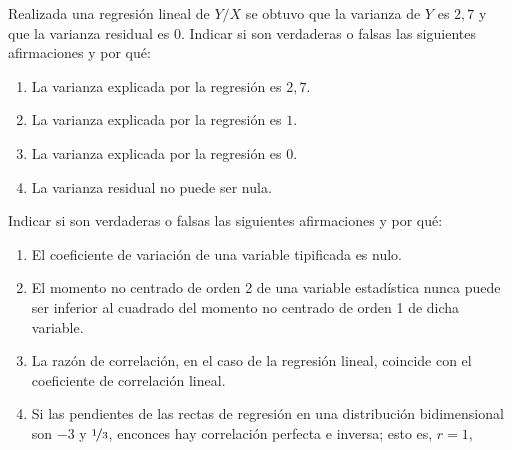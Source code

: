 \documentclass[12pt]{article}
\begin{document}
    \begin{ejercicio}
        Realizada una regresión lineal de $Y/X$ se obtuvo que la varianza de $Y$ es $2,7$ y que la varianza residual es 0. Indicar si son verdaderas o falsas las siguientes afirmaciones y por qué:
        \begin{enumerate}[label=\alph*)]
            \item La varianza explicada por la regresión es $2,7$.
            \item La varianza explicada por la regresión es $1$.
            \item La varianza explicada por la regresión es $0$.
            \item La varianza residual no puede ser nula.
        \end{enumerate}
    \end{ejercicio}

    \begin{ejercicio}
        Indicar si son verdaderas o falsas las siguientes afirmaciones y por qué:
        \begin{enumerate}[label=\alph*)]
            \item El coeficiente de variación de una variable tipificada es nulo.
            \item El momento no centrado de orden 2 de una variable estadística nunca puede ser inferior al cuadrado del momento no centrado de orden 1 de dicha variable.
            \item La razón de correlación, en el caso de la regresión lineal, coincide con el coeficiente de correlación lineal.
            \item Si las pendientes de las rectas de regresión en una distribución bidimensional son $-3$ y $\nicefrac{1}{3}$, enconces hay correlación perfecta e inversa; esto es, $r=1$,
        \end{enumerate}
    \end{ejercicio}

    \newpage
\end{document}
